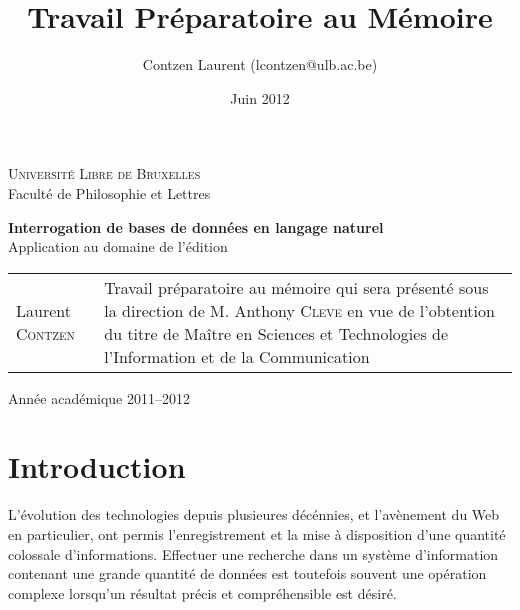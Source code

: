 \documentclass[a4paper,12pt]{article}
\title{Travail Préparatoire au Mémoire}
\date{Juin 2012}
\author{Contzen Laurent (lcontzen@ulb.ac.be)}
\begin{document}
\begin{titlepage}
  \singlespacing
  \begin{center}
    \huge{\textsc{Université Libre de Bruxelles}}\\
    \huge{Faculté de Philosophie et Lettres}
  \end{center}
  \vfill
  \begin{center}
    \Huge{\textbf{Interrogation de bases de données en langage naturel}}\\
    \LARGE{Application au domaine de l'édition}
  \end{center}
  \vfill
  \begin{tabular}{b{5.5cm}b{7.5cm}}
    Laurent \textsc{Contzen} & Travail préparatoire au mémoire qui sera présenté sous la direction de M. Anthony \textsc{Cleve} en vue de l'obtention du titre de Maître en Sciences et Technologies de \mbox{l'Information} et de la Communication\\
  \end{tabular}
  \vfill
  \begin{center}
    Année académique 2011--2012
  \end{center}
\end{titlepage}

\tableofcontents
\newpage

\section{Introduction}
L'évolution des technologies depuis plusieures décénnies, et l'avènement du Web en particulier, ont permis l'enregistrement et la mise à disposition d'une quantité colossale d'informations.
Effectuer une recherche dans un système d'information contenant une grande quantité de données est toutefois souvent une opération complexe lorsqu'un résultat précis et compréhensible est désiré. \\
\end{document}
